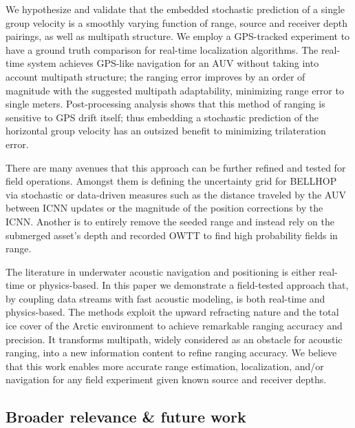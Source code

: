 We hypothesize and validate that the embedded stochastic prediction of a single group velocity is a smoothly varying function of range, source and receiver depth pairings, as well as multipath structure.
We employ a GPS-tracked experiment to have a ground truth comparison for real-time localization algorithms.
The real-time system achieves GPS-like navigation for an AUV without taking into account multipath structure; the ranging error improves by an order of magnitude with the suggested multipath adaptability, minimizing range error to single meters.
Post-processing analysis shows that this method of ranging is sensitive to GPS drift itself; thus embedding a stochastic prediction of the horizontal group velocity has an outsized benefit to minimizing trilateration error.

There are many avenues that this approach can be further refined and tested for field operations.
Amongst them is defining the uncertainty grid for BELLHOP via stochastic or data-driven measures such as the distance traveled by the AUV between ICNN updates or the magnitude of the position corrections by the ICNN.
Another is to entirely remove the seeded range and instead rely on the submerged asset's depth and recorded OWTT to find high probability fields in range.

The literature in underwater acoustic navigation and positioning is either real-time or physics-based.
In this paper we demonstrate a field-tested approach that, by coupling data streams with fast acoustic modeling, is both real-time and physics-based.
The methods exploit the upward refracting nature and the total ice cover of the Arctic environment to achieve remarkable ranging accuracy and precision.
It transforms multipath, widely considered as an obstacle for acoustic ranging, into a new information content to refine ranging accuracy.
We believe that this work enables more accurate range estimation, localization, and/or navigation for any field experiment given known source and receiver depths.

\subsection{Broader relevance \& future work}

